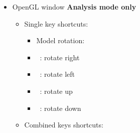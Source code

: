 {\begin{itemize}
\begin{itemize}
\begin{itemize}
\item Selection: \\
\item[] \Ctrl +  : select / unselect all atoms
\item[] \Ctrl +  : copy all selected atom(s)
\item[] \Ctrl +  : create new (empty project) \\
\item Misc: \\
\item[] \Ctrl +  : label / unlabel all atoms 
\item[] \Ctrl +  :  window [Sec.~\ref{ecw}]
\item[] \Ctrl +  :  dialog [Sec.~\ref{mdw}]
\item[] \Ctrl +  :  dialog [Sec.~\ref{rdw}]
\item[] \Ctrl +  : enter / exit fullscreen mode \\ 
\item Camera motion: \\
\item[] \Shift + \UArrow\ : zoom out
\item[] \Shift + \DArrow\ : zoom in \\
\end{itemize}
\end{itemize}
\item OpenGL window {\bf{Analysis mode only}}
\begin{itemize}
\item Single key shortcuts: \\
\begin{itemize}
\item Model rotation: \\
\item[] \RArrow\ : rotate right
\item[] \LArrow\ : rotate left
\item[] \UArrow\ : rotate up
\item[] \DArrow\ : rotate down \\
\end{itemize}
\newpage
\item Combined keys shortcuts: \\

\end{itemize}
\end{itemize}}
